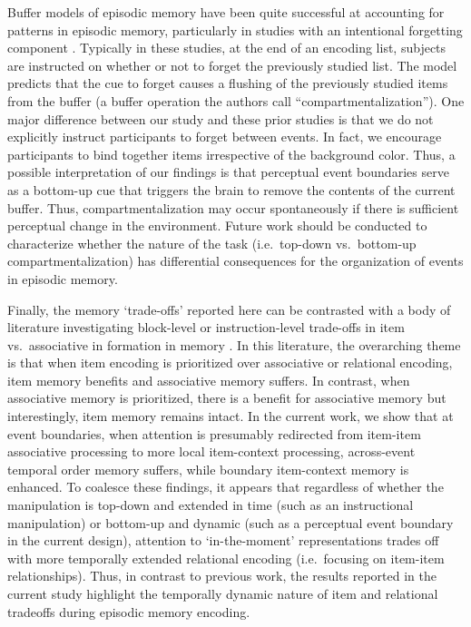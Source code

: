 Buffer models of episodic memory have been quite successful at
accounting for patterns in episodic memory, particularly in studies with
an intentional forgetting component \autocite{lehman_buffer_2013}.
Typically in these studies, at the end of an encoding list, subjects are
instructed on whether or not to forget the previously studied list. The
model predicts that the cue to forget causes a flushing of the
previously studied items from the buffer (a buffer operation the authors
call ``compartmentalization''). One major difference between our study
and these prior studies is that we do not explicitly instruct
participants to forget between events. In fact, we encourage
participants to bind together items irrespective of the background
color. Thus, a possible interpretation of our findings is that
perceptual event boundaries serve as a bottom-up cue that triggers the
brain to remove the contents of the current buffer. Thus,
compartmentalization may occur spontaneously if there is sufficient
perceptual change in the environment. Future work should be conducted to
characterize whether the nature of the task (i.e.~top-down vs.~bottom-up
compartmentalization) has differential consequences for the organization
of events in episodic memory.

Finally, the memory `trade-offs' reported here can be contrasted with a
body of literature investigating block-level or instruction-level
trade-offs in item vs.~associative in formation in memory
\autocites{einstein_levels_1980}{gronlund_time_1989}{hockley_tests_1996}{hunt_relational_1981}{sharps_relational_1992}.
In this literature, the overarching theme is that when item encoding is
prioritized over associative or relational encoding, item memory
benefits and associative memory suffers. In contrast, when associative
memory is prioritized, there is a benefit for associative memory but
interestingly, item memory remains intact. In the current work, we show
that at event boundaries, when attention is presumably redirected from
item-item associative processing to more local item-context processing,
across-event temporal order memory suffers, while boundary item-context
memory is enhanced. To coalesce these findings, it appears that
regardless of whether the manipulation is top-down and extended in time
(such as an instructional manipulation) or bottom-up and dynamic (such
as a perceptual event boundary in the current design), attention to
`in-the-moment' representations trades off with more temporally extended
relational encoding (i.e.~focusing on item-item relationships). Thus, in
contrast to previous work, the results reported in the current study
highlight the temporally dynamic nature of item and relational tradeoffs
during episodic memory encoding.

